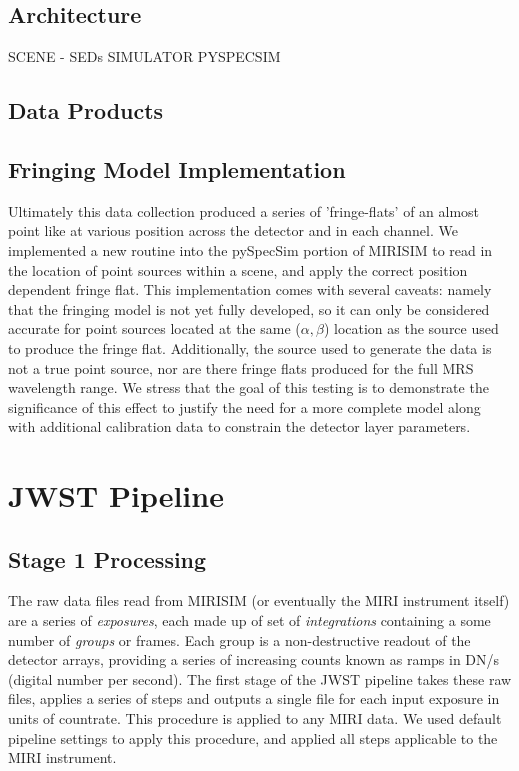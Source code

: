 \subsection{Architecture}
SCENE - SEDs
SIMULATOR
PYSPECSIM
\subsection{Data Products}
\begin{figure}
	\caption{\label{fig:fringeflat}}
\end{figure}
\subsection{Fringing Model Implementation}
Ultimately this data collection produced a series of 'fringe-flats' of an almost point like at various position across the detector and in each channel.
We implemented a new routine into the pySpecSim portion of MIRISIM to read in the location of point sources within a scene, and apply the correct position dependent fringe flat. 
This implementation comes with several caveats: namely that the fringing model is not yet fully developed, so it can only be considered accurate for point sources located at the same ($\alpha,\beta$) location as the source used to produce the fringe flat. Additionally, the source used to generate the data is not a true point source, nor are there fringe flats produced for the full MRS wavelength range.
We stress that the goal of this testing is to demonstrate the significance of this effect to justify the need for a more complete model along with additional calibration data to constrain the detector layer parameters.

\section{JWST Pipeline}
\cite{Bushouse2015} %
\cite{Labiano-Ortega2016} %
\subsection{Stage 1 Processing}
The raw data files read from MIRISIM (or eventually the MIRI instrument itself) are a series of \textit{exposures}, each made up of set of \textit{integrations} containing a some number of \textit{groups} or frames.
Each group is a non-destructive readout of the detector arrays, providing a series of increasing counts known as ramps in DN/s (digital number per second). 
The first stage of the JWST pipeline takes these raw files, applies a series of steps and outputs a single file for each input exposure in units of countrate.
This procedure is applied to any MIRI data.
We used default pipeline settings to apply this procedure, and applied all steps applicable to the MIRI instrument.
